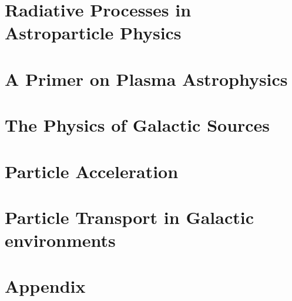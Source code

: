 \documentclass[letterpaper, 11pt, notitlepage]{report}
\begin{document}
\newpage

\tableofcontents\label{sec:contents}

\chapter{Radiative Processes in Astroparticle Physics}
%
%
%
%
%
\newpage

\chapter{A Primer on Plasma Astrophysics}
%
%


\newpage

\chapter{The Physics of Galactic Sources}



\newpage

\chapter{Particle Acceleration}
%
%
%
%
\newpage

\chapter{Particle Transport in Galactic environments}
%
%
%
\newpage

\appendix

\newpage
\chapter{Appendix}
%
%
%
%
%
\newpage



\end{document}
